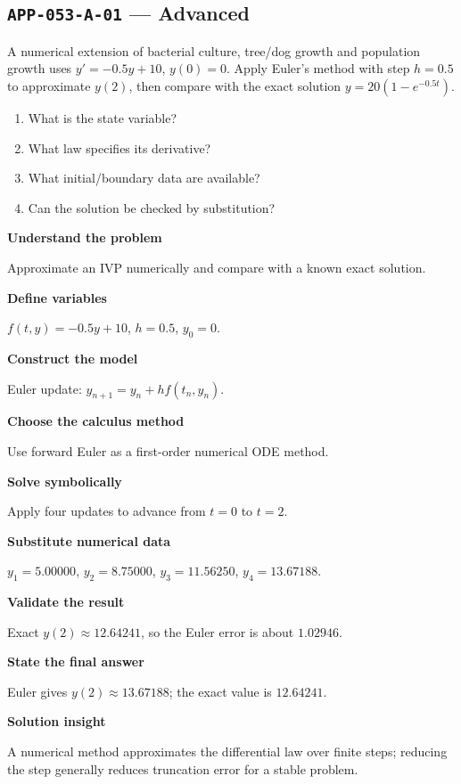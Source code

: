 \documentclass[11pt]{book}
\newcommand{\pid}[1]{\texttt{#1}}
\begin{document}
\subsection*{\pid{APP-053-A-01} — Advanced}
\begin{problembox}
A numerical extension of bacterial culture, tree/dog growth and population growth uses $y'=-0.5y+10$, $y(0)=0$. Apply Euler's method with step $h=0.5$ to approximate $y(2)$, then compare with the exact solution $y=20(1-e^{-0.5t})$.
\end{problembox}
\begin{promptbox}\begin{enumerate}
\item What is the state variable?
\item What law specifies its derivative?
\item What initial/boundary data are available?
\item Can the solution be checked by substitution?
\end{enumerate}\end{promptbox}
\begin{solutionbox}
\textbf{Understand the problem}\par Approximate an IVP numerically and compare with a known exact solution.\par\medskip
\textbf{Define variables}\par $f(t,y)=-0.5y+10$, $h=0.5$, $y_0=0$.\par\medskip
\textbf{Construct the model}\par Euler update: $y_{n+1}=y_n+h f(t_n,y_n)$.\par\medskip
\textbf{Choose the calculus method}\par Use forward Euler as a first-order numerical ODE method.\par\medskip
\textbf{Solve symbolically}\par Apply four updates to advance from $t=0$ to $t=2$.\par\medskip
\textbf{Substitute numerical data}\par $y_1=5.00000$, $y_2=8.75000$, $y_3=11.56250$, $y_4=13.67188$.\par\medskip
\textbf{Validate the result}\par Exact $y(2)\approx 12.64241$, so the Euler error is about $1.02946$.\par\medskip
\textbf{State the final answer}\par Euler gives $y(2)\approx 13.67188$; the exact value is $12.64241$.\par\medskip
\textbf{Solution insight}\par A numerical method approximates the differential law over finite steps; reducing the step generally reduces truncation error for a stable problem.\par\medskip
\end{solutionbox}
\end{document}

